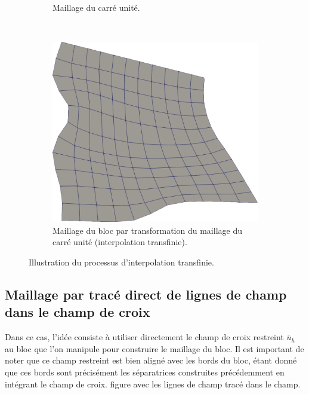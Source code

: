 \begin{figure}[h!]
\begin{subfigure}{0.42\textwidth}
    \caption{Maillage du carré unité.}
    \label{fig:transfini_2}
\end{subfigure}
\\[0.5cm]
\begin{subfigure}{0.5\textwidth}
    \includegraphics[width=\textwidth]{images/transfini_3.pdf}
    \caption{Maillage du bloc par transformation du maillage du carré unité (interpolation transfinie).}
    \label{fig:transfini_3}
\end{subfigure}
\caption{Illustration du processus d'interpolation transfinie.}
\label{fig:transfini}
\end{figure}



\subsection{Maillage par tracé direct de lignes de champ dans le champ de croix}
Dans ce cas, l'idée consiste à utiliser directement le champ de croix restreint $\bar{u}_h$ au bloc que l'on manipule pour construire le maillage du bloc. Il est important de noter que ce champ restreint est bien aligné avec les bords du bloc, étant donné que ces bords sont précisément les séparatrices construites précédemment en intégrant le champ de croix.
figure avec les lignes de champ tracé dans le champ.

